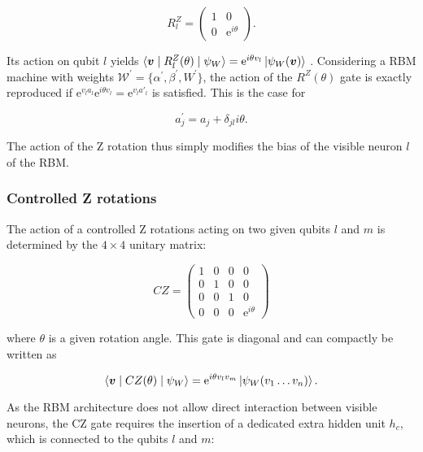 \begin{equation}
    R_l^Z=
    \begin{pmatrix}
        1 & 0 \\
        0 & \mathrm{e}^{i\theta}
    \end{pmatrix} .
\end{equation}

Its action on qubit $l$ yields 
$\langle \bm{v} \mid R_{l}^{Z}(\theta) \mid \psi_{W}  \rangle = 
\mathrm{e}^{i\theta v_{l}} \Ket{\psi_{W}(\bm{v})}
$
. Considering a RBM machine with weights $\mathcal{W}^{\prime} = \{\alpha^{\prime},\beta^{\prime},W^{\prime}\}$, the action of the $R^{Z}(\theta)$
gate is exactly reproduced if $\mathrm{e}^{v_{l}a_{l}}\mathrm{e}^{i\theta v_{l}} = \mathrm{e}^{v_{l}a\prime_{l}}$
is satisfied. This is the case for

\begin{equation}
    a^{\prime}_{j} = a_{j} + \delta_{jl}i\theta.
\end{equation}

The action of the Z rotation thus simply modifies the bias of the visible neuron $l$ of the RBM.

\subsubsection{Controlled Z rotations}
The action of a controlled Z rotations acting on two given qubits $l$ and $m$ is determined by
the $4\times4$ unitary matrix:

\begin{equation}
    CZ =
    \begin{pmatrix}
        1 & 0 & 0 & 0 \\
        0 & 1 & 0 & 0 \\
        0 & 0 & 1 & 0 \\
        0 & 0 & 0 & \mathrm{e}^{i\theta}
    \end{pmatrix}
\end{equation}

where $\theta$ is a given rotation angle. This gate is diagonal and can compactly be written as

\begin{equation}
    \langle \bm{v} \mid CZ(\theta) \mid \psi_{W}  \rangle = 
    \mathrm{e}^{i\theta v_{l}v_{m}}\Ket{\psi_{W}(v_{1} \dots v_{n})}.
\end{equation}

As the RBM architecture does not allow direct interaction between visible neurons, the CZ gate
requires the insertion of a dedicated extra hidden unit $h_{c}$, which is connected
to the qubits $l$ and $m$: 

